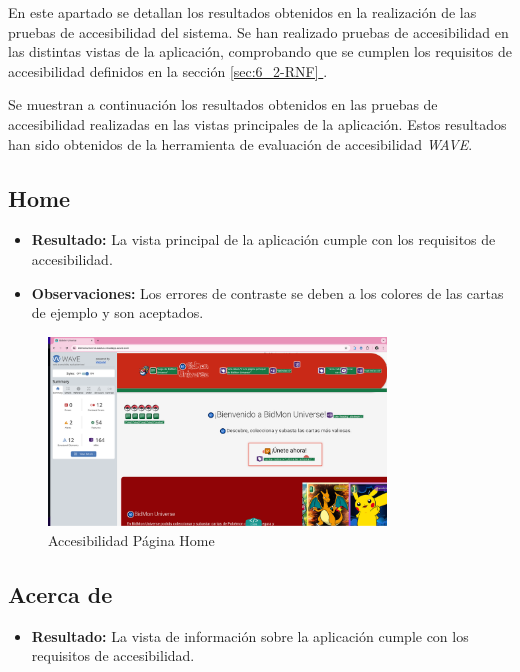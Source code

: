 En este apartado se detallan los resultados obtenidos en la realización de las pruebas de accesibilidad del sistema.
Se han realizado pruebas de accesibilidad en las distintas vistas de la aplicación, comprobando que se cumplen los requisitos de accesibilidad definidos en la sección \hyperlink{sec:6_2-RNF}{\ref*{sec:6_2-RNF} }.

Se muestran a continuación los resultados obtenidos en las pruebas de accesibilidad realizadas en las vistas principales de la aplicación.
Estos resultados han sido obtenidos de la herramienta de evaluación de accesibilidad \textit{WAVE}.

\subsection*{Home}
\begin{itemize}
    \item \textbf{Resultado:} La vista principal de la aplicación cumple con los requisitos de accesibilidad.
    \item \textbf{Observaciones:} Los errores de contraste se deben a los colores de las cartas de ejemplo y son aceptados.
\end{itemize}

\begin{figure}[H]
    \centering
    \includegraphics[width=0.8\textwidth]{figures/accesibilidad/A-acc-home.png}
    \caption{Accesibilidad Página Home}
    \label{fig:Acc-Home}
\end{figure}

\subsection*{Acerca de}
\begin{itemize}
    \item \textbf{Resultado:} La vista de información sobre la aplicación cumple con los requisitos de accesibilidad.
\end{itemize}


